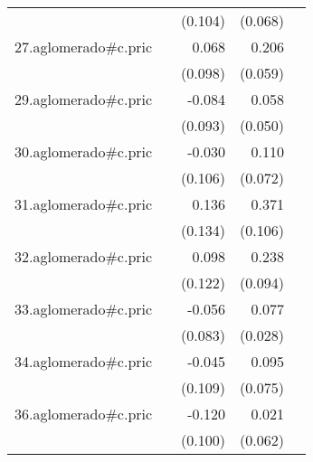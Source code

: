 {\begin{longtable}{l*{4}{D{.}{.}{-1}}}
            &                     &     (0.104)         &     (0.068)         &                     \\
\addlinespace
27.aglomerado#c.pric&                     &       0.068         &       0.206\sym{***}&                     \\
            &                     &     (0.098)         &     (0.059)         &                     \\
\addlinespace
29.aglomerado#c.pric&                     &      -0.084         &       0.058         &                     \\
            &                     &     (0.093)         &     (0.050)         &                     \\
\addlinespace
30.aglomerado#c.pric&                     &      -0.030         &       0.110         &                     \\
            &                     &     (0.106)         &     (0.072)         &                     \\
\addlinespace
31.aglomerado#c.pric&                     &       0.136         &       0.371\sym{***}&                     \\
            &                     &     (0.134)         &     (0.106)         &                     \\
\addlinespace
32.aglomerado#c.pric&                     &       0.098         &       0.238\sym{*}  &                     \\
            &                     &     (0.122)         &     (0.094)         &                     \\
\addlinespace
33.aglomerado#c.pric&                     &      -0.056         &       0.077\sym{**} &                     \\
            &                     &     (0.083)         &     (0.028)         &                     \\
\addlinespace
34.aglomerado#c.pric&                     &      -0.045         &       0.095         &                     \\
            &                     &     (0.109)         &     (0.075)         &                     \\
\addlinespace
36.aglomerado#c.pric&                     &      -0.120         &       0.021         &                     \\
            &                     &     (0.100)         &     (0.062)         &                     \\

\end{longtable}}
